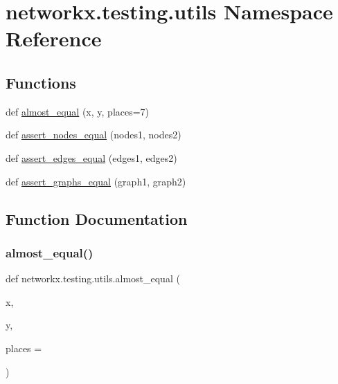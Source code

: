 \hypertarget{namespacenetworkx_1_1testing_1_1utils}{}\section{networkx.\+testing.\+utils Namespace Reference}
\label{namespacenetworkx_1_1testing_1_1utils}
\subsection*{Functions}
\begin{DoxyCompactItemize}
\item 
def \hyperlink{namespacenetworkx_1_1testing_1_1utils_a1afe21ad257290bf1e17a79151e5ad70}{almost\+\_\+equal} (x, y, places=7)
\item 
def \hyperlink{namespacenetworkx_1_1testing_1_1utils_ac824183ea64a1feb4a92294ddad19e58}{assert\+\_\+nodes\+\_\+equal} (nodes1, nodes2)
\item 
def \hyperlink{namespacenetworkx_1_1testing_1_1utils_a30538429dfdd12837e1670758b0dd726}{assert\+\_\+edges\+\_\+equal} (edges1, edges2)
\item 
def \hyperlink{namespacenetworkx_1_1testing_1_1utils_a9fda30080fc05e9c2e4603d6c465cbb6}{assert\+\_\+graphs\+\_\+equal} (graph1, graph2)
\end{DoxyCompactItemize}


\subsection{Function Documentation}
\mbox{\label{namespacenetworkx_1_1testing_1_1utils_a1afe21ad257290bf1e17a79151e5ad70}} 
\subsubsection{\texorpdfstring{almost\+\_\+equal()}{almost\_equal()}}
{\footnotesize\ttfamily def networkx.\+testing.\+utils.\+almost\+\_\+equal (\begin{DoxyParamCaption}\item[{}]{x,  }\item[{}]{y,  }\item[{}]{places = {} }\end{DoxyParamCaption})}

